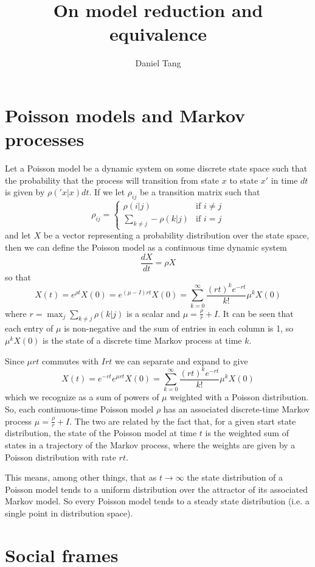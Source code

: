 \documentclass[a4paper]{article}
\title{On model reduction and equivalence}
\author{Daniel Tang}
\begin{document}
\maketitle
\section{Poisson models and Markov processes}

Let a Poisson model be a dynamic system on some discrete state space such that the probability that the process will transition from state $x$ to state $x'$ in time $dt$ is given by $\rho('x|x)dt$. If we let $\rho_{ij}$ be a transition matrix such that
\[
\rho_{ij} = 
\begin{cases}
\rho(i|j) & \text{if } i \ne j\\
\sum_{k \ne j} -\rho(k|j) & \text{if } i = j
\end{cases}
\]
and let $X$ be a vector representing a probability distribution over the state space, then we can define the Poisson model as a continuous time dynamic system
\[
\frac{dX}{dt} = \rho X
\]
so that
\[
X(t) = e^{\rho t}X(0) = e^{(\mu - I)rt}X(0) = \sum_{k=0}^\infty \frac{ (rt)^k e^{-rt}}{k!}\mu^kX(0)
\]
where $r = \max_j \sum_{k \ne j} \rho(k|j)$ is a scalar and $\mu = \frac{\rho}{r} + I$. It can be seen that each entry of $\mu$ is non-negative and the sum of entries in each column is 1, so $\mu^k X(0)$ is the state of a discrete time Markov process at time $k$.

Since $\mu rt$ commutes with $Irt$ we can separate and expand to give
\[
X(t) = e^{-rt}e^{\mu rt}X(0) = \sum_{k=0}^\infty \frac{ (rt)^k e^{-rt}}{k!}\mu^kX(0)
\]
which we recognize as a sum of powers of $\mu$ weighted with a Poisson distribution. So, each continuous-time Poisson model $\rho$ has an associated discrete-time Markov process $\mu = \frac{\rho}{r} + I$. The two are related by the fact that, for a given start state distribution, the state of the Poisson model at time $t$ is the weighted sum of states in a trajectory of the Markov process, where the weights are given by a Poisson distribution with rate $rt$.

This means, among other things, that as $t \to \infty$ the state distribution of a Poisson model tends to a uniform distribution over the attractor of its associated Markov model. So every Poisson model tends to a steady state distribution (i.e. a single point in distribution space).

\section{Social frames}
\end{document}
